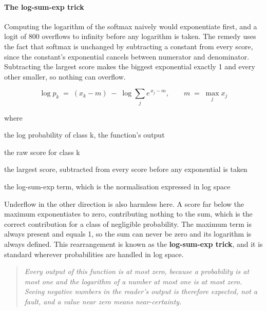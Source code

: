 \paragraph{The log-sum-exp trick}
Computing the logarithm of the softmax naively would exponentiate first, and a logit of 800 overflows to infinity before any logarithm is taken. The remedy uses the fact that softmax is unchanged by subtracting a constant from every score, since the constant's exponential cancels between numerator and denominator. Subtracting the largest score makes the biggest exponential exactly 1 and every other smaller, so nothing can overflow.


\begin{equation}
\log p_{k} \;=\; (x_{k} - m) \;-\; \log \sum_{j} e^{\,x_{j} - m}, \qquad m \;=\; \max_{j} x_{j}
\end{equation}

\noindent where
\begin{description}[leftmargin=2.4em,style=nextline,font=\normalfont\ttfamily]\setlength\itemsep{1pt}
  \item[{$\log p_k$}] \normalfont the log probability of class k, the function's output
  \item[{$x_k$}] \normalfont the raw score for class k
  \item[{$m$}] \normalfont the largest score, subtracted from every score before any exponential is taken
  \item[{$\log \sum_j e^{x_j - m}$}] \normalfont the log-sum-exp term, which is the normalisation expressed in log space
\end{description}
Underflow in the other direction is also harmless here. A score far below the maximum exponentiates to zero, contributing nothing to the sum, which is the correct contribution for a class of negligible probability. The maximum term is always present and equals 1, so the sum can never be zero and its logarithm is always defined. This rearrangement is known as the \textbf{log-sum-exp trick}, and it is standard wherever probabilities are handled in log space.


\begin{quote}\small\itshape Every output of this function is at most zero, because a probability is at most one and the logarithm of a number at most one is at most zero. Seeing negative numbers in the reader's output is therefore expected, not a fault, and a value near zero means near-certainty.\end{quote}

